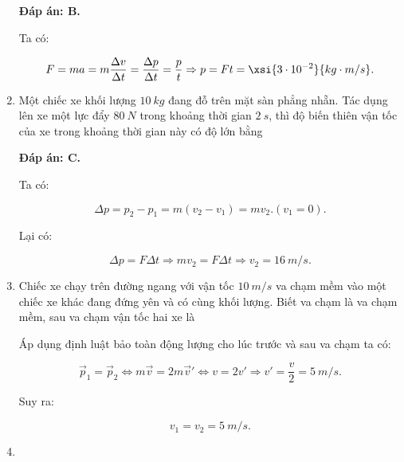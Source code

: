 \begin{enumerate}[label=\bfseries Câu \arabic*:]
	\hideall
	{	
		\textbf{Đáp án: B.}
		
		Ta có:
		
		$$F = ma = m \dfrac{\Delta v}{\Delta t} = \dfrac{\Delta p}{\Delta t} = \dfrac{p}{t} \Rightarrow p = Ft = \xsi{3\cdot 10^{-2}}{kg\cdot m/s}.$$
	}
	\item {}
	
	
	{Một chiếc xe khối lượng $\SI{10}{kg}$ đang đỗ trên mặt sàn phẳng nhẵn. Tác dụng lên xe một lực đẩy $\SI{80}{N}$ trong khoảng thời gian $\SI{2}{s}$, thì độ biến thiên vận tốc của xe trong khoảng thời gian này có độ lớn bằng 
	}
	
	\hideall
	{	
		\textbf{Đáp án: C.}
		
		Ta có:
		
		$$\Delta p = p_2 - p_1 = m(v_2-v_1) = mv_2. (v_1 = 0).$$
		
		Lại có:
		
		$$\Delta p = F\Delta t \Rightarrow mv_2 = F\Delta t \Rightarrow v_2 = \SI{16}{m/s}.$$
	}
	\item {}
	
	
	{Chiếc xe chạy trên đường ngang với vận tốc $\SI{10}{m/s}$ va chạm mềm vào một chiếc xe khác đang đứng yên và có cùng khối lượng. Biết va chạm là va chạm mềm, sau va chạm vận tốc hai xe là
	}
	
	\hideall
	{	
		Áp dụng định luật bảo toàn động lượng cho lúc trước và sau va chạm ta có:
		
		$$\vec p_1 = \vec p_2 \Leftrightarrow m\vec v = 2m \vec v' \Leftrightarrow v = 2v' \Rightarrow v' = \dfrac{v}{2} = \SI{5}{m/s}.$$
		
		Suy ra:
		
		$$v_1 = v_2 = \SI{5}{m/s}.$$
	}
	\item {}
	

\end{enumerate}

